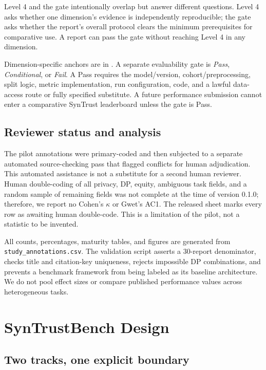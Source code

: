\documentclass[11pt,letterpaper]{article}
\begin{document}
Level 4 and the gate intentionally overlap but answer different questions. Level 4 asks whether one dimension's evidence is independently reproducible; the gate asks whether the report's overall protocol clears the minimum prerequisites for comparative use. A report can pass the gate without reaching Level 4 in any dimension.

Dimension-specific anchors are in . A separate evaluability gate is \emph{Pass}, \emph{Conditional}, or \emph{Fail}. A Pass requires the model/version, cohort/preprocessing, split logic, metric implementation, run configuration, code, and a lawful data-access route or fully specified substitute. A future performance submission cannot enter a comparative SynTrust leaderboard unless the gate is Pass.

\subsection{Reviewer status and analysis}

The pilot annotations were primary-coded and then subjected to a separate automated source-checking pass that flagged conflicts for human adjudication. This automated assistance is not a substitute for a second human reviewer. Human double-coding of all privacy, DP, equity, ambiguous task fields, and a random sample of remaining fields was not complete at the time of version 0.1.0; therefore, we report no Cohen's $\kappa$ or Gwet's AC1. The released sheet marks every row as awaiting human double-code. This is a limitation of the pilot, not a statistic to be invented.

All counts, percentages, maturity tables, and figures are generated from \texttt{study\_annotations.csv}. The validation script asserts a 30-report denominator, checks title and citation-key uniqueness, rejects impossible DP combinations, and prevents a benchmark framework from being labeled as its baseline architecture. We do not pool effect sizes or compare published performance values across heterogeneous tasks.

\section{SynTrustBench Design}
\label{sec:design}

\subsection{Two tracks, one explicit boundary}
\end{document}
